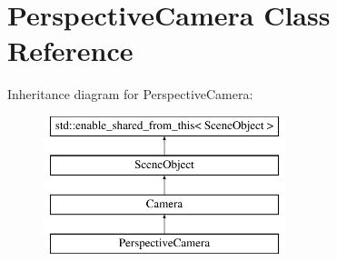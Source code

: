 \hypertarget{class_perspective_camera}{}\section{Perspective\+Camera Class Reference}
\label{class_perspective_camera}
Inheritance diagram for Perspective\+Camera\+:\begin{figure}[H]
\begin{center}
\leavevmode
\includegraphics[height=4.000000cm]{class_perspective_camera}
\end{center}
\end{figure}

